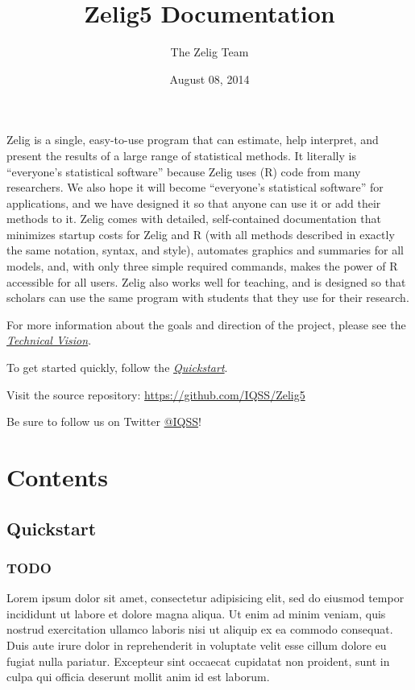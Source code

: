 \documentclass[letterpaper,10pt,english]{sphinxmanual}
\title{Zelig5 Documentation}
\date{August 08, 2014}
\author{The Zelig Team}
\begin{document}
\maketitle
\tableofcontents
{}\label{index::doc}

\label{index:about}
Zelig is a single, easy-to-use program that can estimate, help interpret, and present the results of a large range of statistical methods. It literally is ``everyone's statistical software'' because Zelig uses (R) code from many researchers. We also hope it will become ``everyone's statistical software'' for applications, and we have designed it so that anyone can use it or add their methods to it. Zelig comes with detailed, self-contained documentation that minimizes startup costs for Zelig and R (with all methods described in exactly the same notation, syntax, and style), automates graphics and summaries for all models, and, with only three simple required commands, makes the power of R accessible for all users. Zelig also works well for teaching, and is designed so that scholars can use the same program with students that they use for their research.

For more information about the goals and direction of the project, please
see the {\hyperref[index:technicalvision]{\emph{Technical Vision}}}.

To get started quickly, follow the {\hyperref[docs/quickstart:quickstart]{\emph{Quickstart}}}.

Visit the source repository: \href{https://github.com/IQSS/Zelig5}{https://github.com/IQSS/Zelig5}

Be sure to follow us on Twitter \href{https://twitter.com/IQSS}{@IQSS}!


\chapter{Contents}
\label{index:welcome-to-zelig}\label{index:contents}

\section{Quickstart}
\label{docs/quickstart::doc}\label{docs/quickstart:quickstart}\label{docs/quickstart:id1}

\subsection{TODO}
\label{docs/quickstart:todo}
Lorem ipsum dolor sit amet, consectetur adipisicing elit, sed do eiusmod tempor incididunt ut labore et dolore magna aliqua. Ut enim ad minim veniam, quis nostrud exercitation ullamco laboris nisi ut aliquip ex ea commodo consequat. Duis aute irure dolor in reprehenderit in voluptate velit esse cillum dolore eu fugiat nulla pariatur. Excepteur sint occaecat cupidatat non proident, sunt in culpa qui officia deserunt mollit anim id est laborum.
\end{document}
